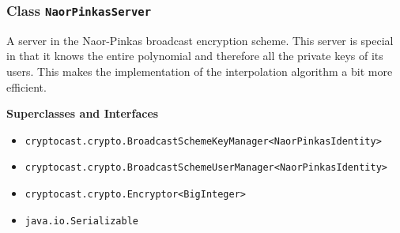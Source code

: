 \subsubsection{Class \lstinline|NaorPinkasServer|}
A server in the Naor-Pinkas broadcast encryption scheme. This server is special in that it knows
 the entire polynomial and therefore all the private keys of its users. This makes the implementation
 of the interpolation algorithm a bit more efficient. \\
\noindent\begin{minipage}[t]{5cm}
\vspace{0.3em}
\hspace*{2em}
\vspace{0.3em}
\end{minipage}



\textbf{\sffamily Superclasses and Interfaces}
\begin{itemize}
\item \lstinline|cryptocast.crypto.BroadcastSchemeKeyManager<NaorPinkasIdentity>|
\item \lstinline|cryptocast.crypto.BroadcastSchemeUserManager<NaorPinkasIdentity>|
\item \lstinline|cryptocast.crypto.Encryptor<BigInteger>|
\item \lstinline|java.io.Serializable|
\end{itemize}



